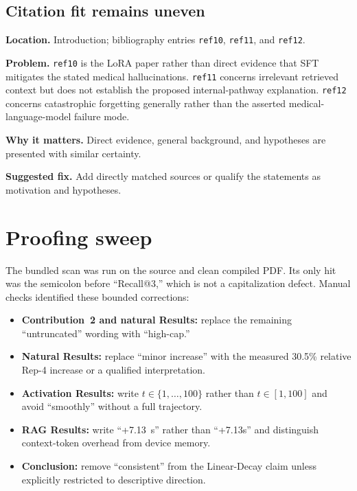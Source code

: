 \documentclass[11pt]{article}
\newcommand{\findinglabel}[1]{\textbf{#1}}
\begin{document}
\subsection*{Citation fit remains uneven}

\findinglabel{Location.} Introduction; bibliography entries \texttt{ref10}, \texttt{ref11}, and \texttt{ref12}.

\findinglabel{Problem.} \texttt{ref10} is the LoRA paper rather than direct evidence that SFT mitigates the stated medical hallucinations.  \texttt{ref11} concerns irrelevant retrieved context but does not establish the proposed internal-pathway explanation.  \texttt{ref12} concerns catastrophic forgetting generally rather than the asserted medical-language-model failure mode.

\findinglabel{Why it matters.} Direct evidence, general background, and hypotheses are presented with similar certainty.

\findinglabel{Suggested fix.} Add directly matched sources or qualify the statements as motivation and hypotheses.

\section*{Proofing sweep}

The bundled scan was run on the source and clean compiled PDF.  Its only hit was the semicolon before ``Recall@3,'' which is not a capitalization defect.  Manual checks identified these bounded corrections:

\begin{itemize}
    \item \textbf{Contribution~2 and natural Results:} replace the remaining ``untruncated'' wording with ``high-cap.''
    \item \textbf{Natural Results:} replace ``minor increase'' with the measured 30.5\% relative Rep-4 increase or a qualified interpretation.
    \item \textbf{Activation Results:} write $t\in\{1,\ldots,100\}$ rather than $t\in[1,100]$ and avoid ``smoothly'' without a full trajectory.
    \item \textbf{RAG Results:} write ``+7.13~s'' rather than ``+7.13s'' and distinguish context-token overhead from device memory.
    \item \textbf{Conclusion:} remove ``consistent'' from the Linear-Decay claim unless explicitly restricted to descriptive direction.
\end{itemize}
\end{document}
